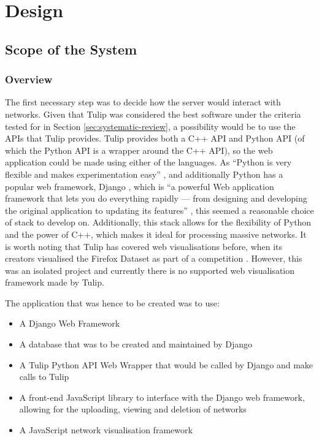 \documentclass[../dissertation.tex]{subfiles}
\begin{document}
\chapter{Design}
\label{chap:design}

\section{Scope of the System}
\label{sec:scope}

\subsection{Overview}

The first necessary step was to decide how the server would interact with networks. Given that Tulip was considered the best software under the criteria tested for in Section \ref{sec:systematic-review}, a possibility would be to use the APIs that Tulip provides. Tulip provides both a C++ API \cite{tulipcppapi} and Python API \cite{tulippyapi} (of which the Python API is a wrapper around the C++ API), so the web application could be made using either of the languages. As ``Python is very flexible and makes experimentation easy'' \cite{zelle2004python}, and additionally Python has a popular web framework, Django \cite{django}, which is ``a powerful Web application framework that lets you do everything rapidly — from designing and developing the original application to updating its features'' \cite{forcier2008python}, this seemed a reasonable choice of stack to develop on. Additionally, this stack allows for the flexibility of Python and the power of C++, which makes it ideal for processing massive networks. It is worth noting that Tulip has covered web visualisations before, when its creators visualised the Firefox Dataset as part of a competition \cite{tulipfirefox}. However, this was an isolated project and currently there is no supported web visualisation framework made by Tulip.

The application that was hence to be created was to use:

\begin{itemize}
    \item A Django Web Framework
    \item A database that was to be created and maintained by Django
    \item A Tulip Python API Web Wrapper that would be called by Django and make calls to Tulip
    \item A front-end JavaScript library to interface with the Django web framework, allowing for the uploading, viewing and deletion of networks
    \item A JavaScript network visualisation framework
\end{itemize}
\end{document}
